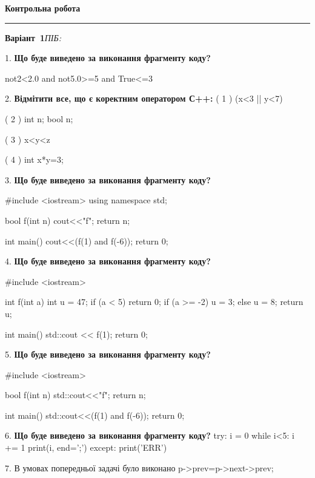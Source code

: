 \documentclass[11pt]{article}
\begin{document}
{\centering\Large\bfseries Контрольна робота\par}
\medskip
\noindent\rule{\linewidth}{0.5pt}
\smallskip
\noindent\textbf{Варіант \No\,1}\hfill \textit{ПІБ:}\,\underline{\hspace{60mm}}
\vspace{4mm}

1. \textbf{Що буде виведено за виконання фрагменту коду?}

not2<2.0 and not5.0>=5 and True<=3
\par\vspace{5mm}
2. %
\textbf{Відмітити все, що є коректним оператором С++:}
( 1 ) (x<3 || y<7)

( 2 ) int n; bool n;

( 3 ) x<y<z

( 4 ) int x*y=3;
\par\vspace{5mm}
3. \textbf{Що буде виведено за виконання фрагменту коду?}

#include <iostream>
using namespace std;

bool f(int n){
    cout<<"f";
    return n;
}

int main(){
    cout<<(f(1) and f(-6));
    return 0;
}
\par\vspace{5mm}
4. \textbf{Що буде виведено за виконання фрагменту коду?}

#include <iostream>

int f(int a){
    int u = 47;
    if (a < 5) 
        return 0;
    if (a >= -2)
         u = 3;
    else
         u = 8;
    return u;
}

int main(){
    std::cout << f(1);
    return 0;
}

\par\vspace{5mm}
5. \textbf{Що буде виведено за виконання фрагменту коду?}

#include <iostream>

bool f(int n){
    std::cout<<"f";
    return n;
}

int main(){
    std::cout<<(f(1) and f(-6));
    return 0;
}
\par\vspace{5mm}
6. \textbf{Що буде виведено за виконання фрагменту коду?}
try:
    i = 0
    while i<5:
        i += 1
    print(i, end=';')
except:
    print('ERR')
\par\vspace{5mm}
7. 
В умовах попередньої задачі було виконано p->prev=p->next->prev;
\end{document}
